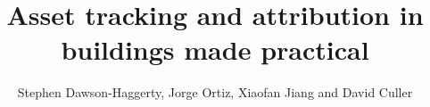 \documentclass[10pt,print,letterpaper]{sigplan-proc-varsize}
\begin{document}

\title{Asset tracking and attribution in buildings made practical}
\author{\alignauthor Stephen Dawson-Haggerty, Jorge Ortiz, Xiaofan Jiang and David Culler\\
\\
 \\ 
 \\
} 



%
%
%
%
%
\end{document}
